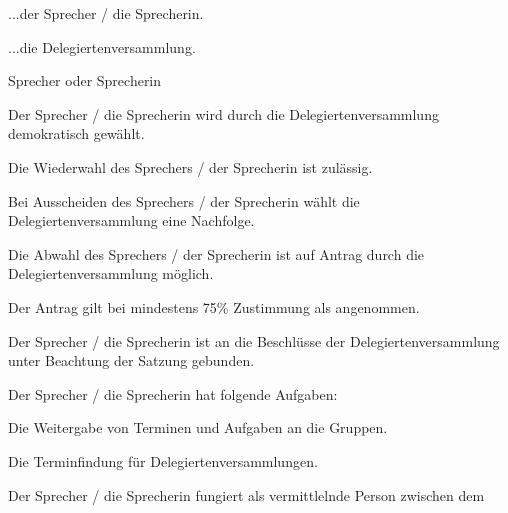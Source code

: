\begin{legal}
\begin{legal}
\begin{legal}
                    \item ...der Sprecher / die Sprecherin.
                    \item ...die Delegiertenversammlung.
                \end{legal}
        \end{legal}
    \item Sprecher oder Sprecherin
        \begin{legal}
            \item Der Sprecher / die Sprecherin wird durch die Delegiertenversammlung 
                  demokratisch gewählt.
            \item Die Wiederwahl des Sprechers / der Sprecherin ist zulässig.
            \item Bei Ausscheiden des Sprechers / der Sprecherin wählt die Delegiertenversammlung 
                  eine Nachfolge.
            \item Die Abwahl des Sprechers / der Sprecherin ist auf Antrag durch die 
                  Delegiertenversammlung möglich.
                \begin{legal}
                    \item Der Antrag gilt bei mindestens 75\% Zustimmung als angenommen.
                \end{legal}
            \item Der Sprecher / die Sprecherin ist an die Beschlüsse der Delegiertenversammlung 
                  unter Beachtung der Satzung gebunden.
            \item Der Sprecher / die Sprecherin hat folgende Aufgaben:
                  \begin{legal}
                        \item Die Weitergabe von Terminen und Aufgaben an die Gruppen.
                        \item Die Terminfindung für Delegiertenversammlungen.
                  \end{legal}
            \item Der Sprecher / die Sprecherin fungiert als vermittlelnde Person zwischen dem 

\end{legal}
\end{legal}
